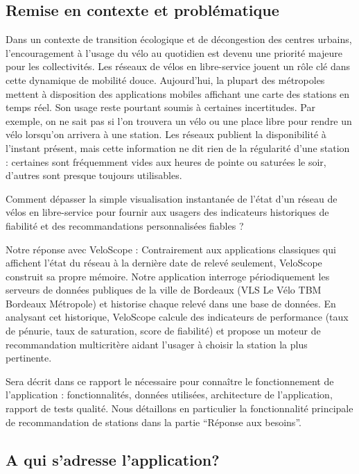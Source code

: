 \documentclass[
  french,
  11pt,
  a4paper,
]{article}
\begin{document}
\subsection{Remise en contexte et
problématique}\label{remise-en-contexte-et-probluxe9matique}

Dans un contexte de transition écologique et de décongestion des centres
urbains, l'encouragement à l'usage du vélo au quotidien est devenu une
priorité majeure pour les collectivités. Les réseaux de vélos en
libre-service jouent un rôle clé dans cette dynamique de mobilité douce.
Aujourd'hui, la plupart des métropoles mettent à disposition des
applications mobiles affichant une carte des stations en temps réel. Son
usage reste pourtant soumis à certaines incertitudes. Par exemple, on ne
sait pas si l'on trouvera un vélo ou une place libre pour rendre un vélo
lorsqu'on arrivera à une station. Les réseaux publient la disponibilité
à l'instant présent, mais cette information ne dit rien de la régularité
d'une station : certaines sont fréquemment vides aux heures de pointe ou
saturées le soir, d'autres sont presque toujours utilisables.

Comment dépasser la simple visualisation instantanée de l'état d'un
réseau de vélos en libre-service pour fournir aux usagers des
indicateurs historiques de fiabilité et des recommandations
personnalisées fiables ?

Notre réponse avec VeloScope : Contrairement aux applications classiques
qui affichent l'état du réseau à la dernière date de relevé seulement,
VeloScope construit sa propre mémoire. Notre application interroge
périodiquement les serveurs de données publiques de la ville de Bordeaux
(VLS Le Vélo TBM Bordeaux Métropole) et historise chaque relevé dans une
base de données. En analysant cet historique, VeloScope calcule des
indicateurs de performance (taux de pénurie, taux de saturation, score
de fiabilité) et propose un moteur de recommandation multicritère aidant
l'usager à choisir la station la plus pertinente.

Sera décrit dans ce rapport le nécessaire pour connaître le
fonctionnement de l'application : fonctionnalités, données utilisées,
architecture de l'application, rapport de tests qualité. Nous détaillons
en particulier la fonctionnalité principale de recommandation de
stations dans la partie ``Réponse aux besoins''.

\subsection{A qui s'adresse
l'application?}\label{a-qui-sadresse-lapplication}
\end{document}
